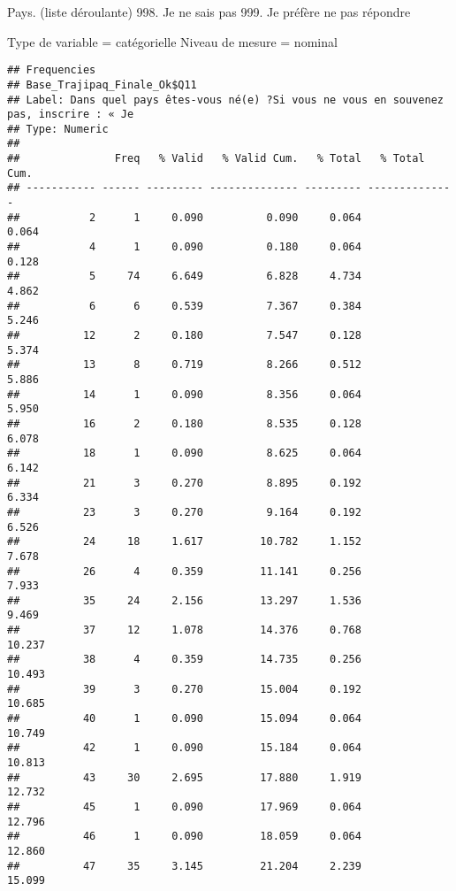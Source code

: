 \documentclass[
]{article}
\newenvironment{Shaded}{\begin{snugshade}}{\end{snugshade}}
\newcommand{\FunctionTok}[1]{\textcolor[rgb]{0.00,0.00,0.00}{#1}}
\newcommand{\NormalTok}[1]{#1}
\newcommand{\SpecialCharTok}[1]{\textcolor[rgb]{0.00,0.00,0.00}{#1}}
\begin{document}
Pays. (liste déroulante) 998. Je ne sais pas 999. Je préfère ne pas
répondre

Type de variable = catégorielle Niveau de mesure = nominal

\begin{Shaded}
\end{Shaded}

\begin{verbatim}
## Frequencies  
## Base_Trajipaq_Finale_Ok$Q11  
## Label: Dans quel pays êtes-vous né(e) ?Si vous ne vous en souvenez pas, inscrire : « Je  
## Type: Numeric  
## 
##               Freq   % Valid   % Valid Cum.   % Total   % Total Cum.
## ----------- ------ --------- -------------- --------- --------------
##           2      1     0.090          0.090     0.064          0.064
##           4      1     0.090          0.180     0.064          0.128
##           5     74     6.649          6.828     4.734          4.862
##           6      6     0.539          7.367     0.384          5.246
##          12      2     0.180          7.547     0.128          5.374
##          13      8     0.719          8.266     0.512          5.886
##          14      1     0.090          8.356     0.064          5.950
##          16      2     0.180          8.535     0.128          6.078
##          18      1     0.090          8.625     0.064          6.142
##          21      3     0.270          8.895     0.192          6.334
##          23      3     0.270          9.164     0.192          6.526
##          24     18     1.617         10.782     1.152          7.678
##          26      4     0.359         11.141     0.256          7.933
##          35     24     2.156         13.297     1.536          9.469
##          37     12     1.078         14.376     0.768         10.237
##          38      4     0.359         14.735     0.256         10.493
##          39      3     0.270         15.004     0.192         10.685
##          40      1     0.090         15.094     0.064         10.749
##          42      1     0.090         15.184     0.064         10.813
##          43     30     2.695         17.880     1.919         12.732
##          45      1     0.090         17.969     0.064         12.796
##          46      1     0.090         18.059     0.064         12.860
##          47     35     3.145         21.204     2.239         15.099

\end{verbatim}
\end{document}

